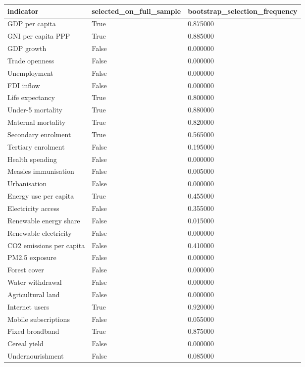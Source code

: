 \begin{tabular}{lll}
\hline
indicator & selected\_on\_full\_sample & bootstrap\_selection\_frequency \\
\hline
GDP per capita & True & 0.875000 \\
GNI per capita PPP & True & 0.885000 \\
GDP growth & False & 0.000000 \\
Trade openness & False & 0.000000 \\
Unemployment & False & 0.000000 \\
FDI inflow & False & 0.000000 \\
Life expectancy & True & 0.800000 \\
Under-5 mortality & True & 0.880000 \\
Maternal mortality & True & 0.820000 \\
Secondary enrolment & True & 0.565000 \\
Tertiary enrolment & False & 0.195000 \\
Health spending & False & 0.000000 \\
Measles immunisation & False & 0.005000 \\
Urbanisation & False & 0.000000 \\
Energy use per capita & True & 0.455000 \\
Electricity access & False & 0.355000 \\
Renewable energy share & False & 0.015000 \\
Renewable electricity & False & 0.000000 \\
CO2 emissions per capita & False & 0.410000 \\
PM2.5 exposure & False & 0.000000 \\
Forest cover & False & 0.000000 \\
Water withdrawal & False & 0.000000 \\
Agricultural land & False & 0.000000 \\
Internet users & True & 0.920000 \\
Mobile subscriptions & False & 0.055000 \\
Fixed broadband & True & 0.875000 \\
Cereal yield & False & 0.000000 \\
Undernourishment & False & 0.085000 \\
\hline
\end{tabular}
